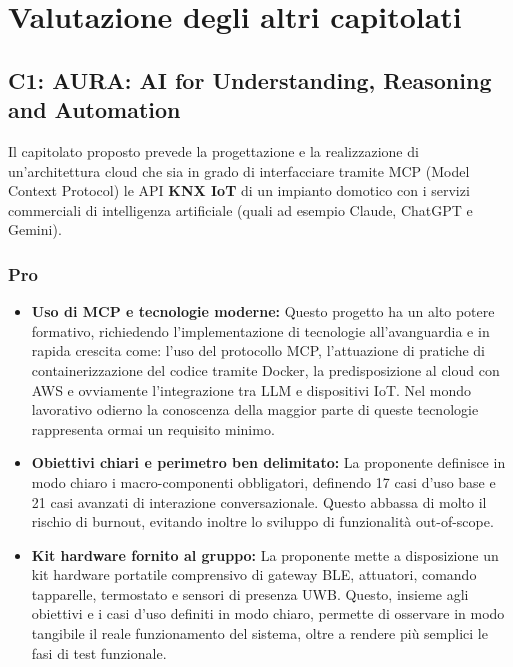 \section{Valutazione degli altri capitolati}

\subsection{C1:  AURA: AI for Understanding, Reasoning and Automation}

Il capitolato proposto prevede la progettazione e la realizzazione di un'architettura cloud che sia in grado di interfacciare tramite MCP (Model Context Protocol) le API \textbf{KNX IoT} di un impianto domotico con i servizi commerciali di intelligenza artificiale (quali ad esempio Claude, ChatGPT e Gemini).

\subsubsection{Pro}
\begin{itemize}
    \item \textbf{Uso di MCP e tecnologie moderne:} Questo progetto ha un alto potere formativo, richiedendo l'implementazione di tecnologie all'avanguardia e in rapida crescita come: l'uso del protocollo MCP, l'attuazione di pratiche di containerizzazione del codice tramite Docker, la predisposizione al cloud con AWS e ovviamente l'integrazione tra LLM e dispositivi IoT. Nel mondo lavorativo odierno la conoscenza della maggior parte di queste tecnologie rappresenta ormai un requisito minimo. 

    
    \item \textbf{Obiettivi chiari e perimetro ben delimitato:} La proponente definisce in modo chiaro i macro-componenti obbligatori, definendo 17 casi d'uso base e 21 casi avanzati di interazione conversazionale. Questo abbassa di molto il rischio di burnout, evitando inoltre lo sviluppo di funzionalità out-of-scope.
    \item \textbf{Kit hardware fornito al gruppo:} La proponente mette a disposizione un kit hardware portatile comprensivo di gateway BLE, attuatori, comando tapparelle, termostato e sensori di presenza UWB. Questo, insieme agli obiettivi e i casi d'uso definiti in modo chiaro, permette di osservare in modo tangibile il reale funzionamento del sistema, oltre  a rendere più semplici le fasi di test funzionale.
\end{itemize}

